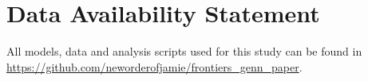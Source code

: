 \documentclass[utf8]{frontiersSCNS} %
\begin{document}
\section*{Data Availability Statement}
All models, data and analysis scripts used for this study can be found in \url{https://github.com/neworderofjamie/frontiers_genn_paper}.
%



\end{document}
